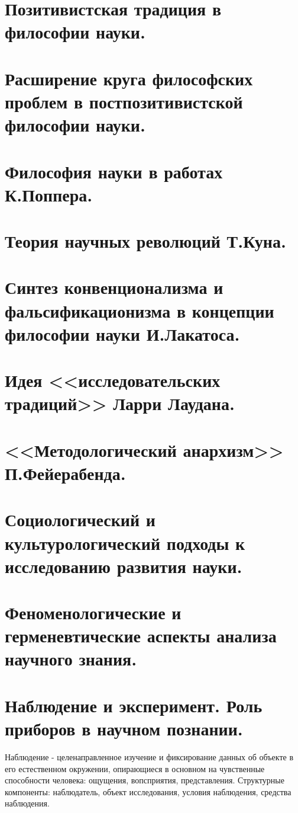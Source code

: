 \documentclass[12pt, specialist, subf, substylefile = spbu.rtx]{disser}
\begin{document}
\section{Позитивистская традиция в философии науки.}

\section{Расширение круга философских проблем в постпозитивистской философии науки.}

\section{Философия науки в работах К.Поппера.}

\section{Теория научных революций Т.Куна.}

\section{Синтез конвенционализма и фальсификационизма в концепции философии науки И.Лакатоса.}

\section{Идея <<исследовательских традиций>> Ларри Лаудана.}

\section{<<Методологический анархизм>> П.Фейерабенда.}

\section{Социологический и культурологический подходы к исследованию развития науки.}

\section{Феноменологические и герменевтические аспекты анализа научного знания.}

\section{Наблюдение и эксперимент. Роль приборов в научном познании.}
Наблюдение - целенаправленное изучение и фиксирование данных об объекте в его естественном окружении, опирающиеся в основном на чувственные способности человека: ощущения, вопсприятия, представления. Структурные компоненты: наблюдатель, объект исследования, условия наблюдения, средства наблюдения.
\end{document}
